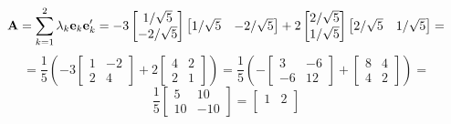 \begin{enumerate}[font=\bfseries]
        \newline
        \[
            \bold{A} = \sum_{k=1}^2{\lambda_k \bold{e}_k \bold{e}_k^\prime}
            =
            -3 \begin{bmatrix}
                1/\sqrt{5} \\
                -2/\sqrt{5}
            \end{bmatrix}
            \begin{bmatrix}
                1/\sqrt{5} & -2/\sqrt{5}
            \end{bmatrix}
            +
            2 \begin{bmatrix}
                2/\sqrt{5} \\
                1/\sqrt{5}
            \end{bmatrix}
            \begin{bmatrix}
                2/\sqrt{5} & 1/\sqrt{5}
            \end{bmatrix}
            =
        \]
        \[
            =
            \frac{1}{5}
            \left(
                -3
                \begin{bmatrix}
                    1 & -2 \\
                    2 & 4
                \end{bmatrix}
                +
                2
                \begin{bmatrix}
                    4 & 2 \\
                    2 & 1
                \end{bmatrix}
            \right)
            =
            \frac{1}{5}
            \left(
                -
                \begin{bmatrix}
                    3 & -6 \\
                    -6 & 12
                \end{bmatrix}
                +
                \begin{bmatrix}
                    8 & 4 \\
                    4 & 2
                \end{bmatrix}
            \right)
            =
        \]
        \[
            \frac{1}{5}
            \begin{bmatrix}
                5 & 10 \\
                10 & -10
            \end{bmatrix}
            =
            \begin{bmatrix}
                1 & 2 \\

\end{bmatrix}\]
\end{enumerate}
